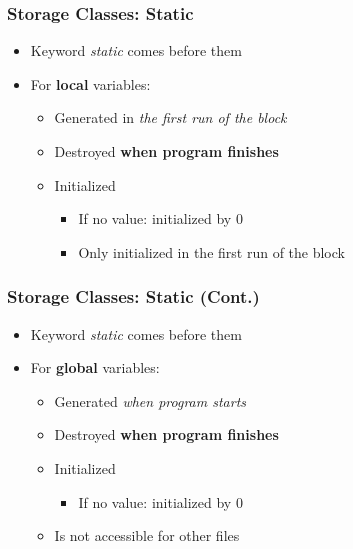 \documentclass{../c-lecture}
\begin{document}
\begin{frame}
  \frametitle{Storage Classes: Static}
  \begin{itemize}
    \item Keyword \textit{\color{YellowOrange} static} comes before them
    \item For \textbf{\color{Goldenrod} local} variables:
    \begin{itemize}
      \item
        Generated in
        \textit{\color{Purple} the first run of the block}
      \item Destroyed \textbf{\color{Cyan} when program finishes}
      \item Initialized
      \begin{itemize}
        \item If no value: initialized by 0
        \item Only initialized in the first run of the block
      \end{itemize}
    \end{itemize}
  \end{itemize}
\end{frame}

\begin{frame}
  \frametitle{Storage Classes: Static (Cont.)}
  \begin{itemize}
    \item Keyword \textit{\color{YellowOrange} static} comes before them
    \item For \textbf{\color{Goldenrod} global} variables:
    \begin{itemize}
      \item Generated \textit{\color{Purple} when program starts}
      \item Destroyed \textbf{\color{Cyan} when program finishes}
      \item Initialized
      \begin{itemize}
        \item If no value: initialized by 0
      \end{itemize}
      \item Is not accessible for other files
    \end{itemize}
  \end{itemize}
\end{frame}
\end{document}
